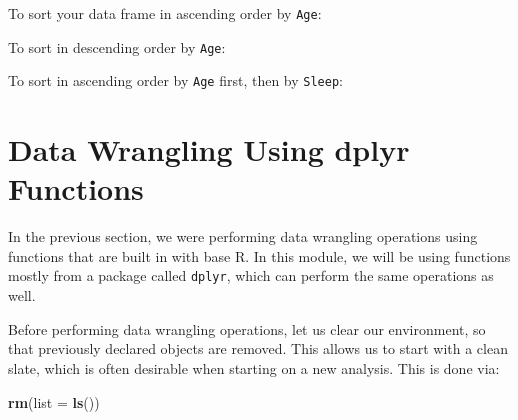 \documentclass[
]{book}
\newenvironment{Shaded}{\begin{snugshade}}{\end{snugshade}}
\newcommand{\AttributeTok}[1]{\textcolor[rgb]{0.13,0.29,0.53}{#1}}
\newcommand{\FunctionTok}[1]{\textcolor[rgb]{0.13,0.29,0.53}{\textbf{#1}}}
\newcommand{\NormalTok}[1]{#1}
\newcommand{\OtherTok}[1]{\textcolor[rgb]{0.56,0.35,0.01}{#1}}
\newcommand{\SpecialCharTok}[1]{\textcolor[rgb]{0.81,0.36,0.00}{\textbf{#1}}}
\begin{document}
To sort your data frame in ascending order by \texttt{Age}:

\begin{Shaded}
\end{Shaded}

To sort in descending order by \texttt{Age}:

\begin{Shaded}
\end{Shaded}

To sort in ascending order by \texttt{Age} first, then by \texttt{Sleep}:

\begin{Shaded}
\end{Shaded}

\hypertarget{data-wrangling-using-dplyr-functions}{%
\section{Data Wrangling Using dplyr Functions}\label{data-wrangling-using-dplyr-functions}}

In the previous section, we were performing data wrangling operations using functions that are built in with base R. In this module, we will be using functions mostly from a package called \texttt{dplyr}, which can perform the same operations as well.

Before performing data wrangling operations, let us clear our environment, so that previously declared objects are removed. This allows us to start with a clean slate, which is often desirable when starting on a new analysis. This is done via:

\begin{Shaded}
\begin{Highlighting}[]
\FunctionTok{rm}\NormalTok{(}\AttributeTok{list =} \FunctionTok{ls}\NormalTok{())}
\end{Highlighting}
\end{Shaded}
\end{document}
